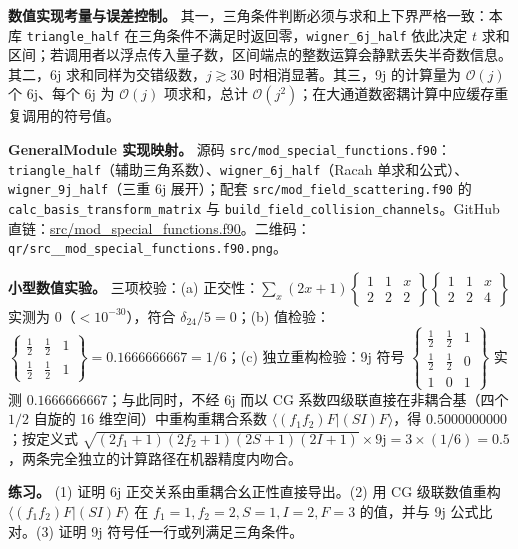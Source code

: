 \documentclass[
]{ctexbook}
\begin{document}
\textbf{数值实现考量与误差控制。}
其一，三角条件判断必须与求和上下界严格一致：本库 \texttt{triangle\_half}
在三角条件不满足时返回零，\texttt{wigner\_6j\_half} 依此决定 \(t\)
求和区间；若调用者以浮点传入量子数，区间端点的整数运算会静默丢失半奇数信息。其二，6j
求和同样为交错级数，\(j\gtrsim 30\) 时相消显著。其三，9j 的计算量为
\(\mathcal{O}(j)\) 个 6j、每个 6j 为 \(\mathcal{O}(j)\) 项求和，总计
\(\mathcal{O}(j^{2})\)；在大通道数密耦计算中应缓存重复调用的符号值。

\textbf{GeneralModule 实现映射。} 源码
\texttt{src/mod\_special\_functions.f90}：\texttt{triangle\_half}（辅助三角系数）、\texttt{wigner\_6j\_half}（Racah
单求和公式）、\texttt{wigner\_9j\_half}（三重 6j 展开）；配套
\texttt{src/mod\_field\_scattering.f90} 的
\texttt{calc\_basis\_transform\_matrix} 与
\texttt{build\_field\_collision\_channels}。GitHub
直链：\href{https://github.com/l1Ha/QuantumGeneralModule/blob/main/src/mod_special_functions.f90}{src/mod\_special\_functions.f90}。二维码：\texttt{qr/src\_\_mod\_special\_functions.f90.png}。

\textbf{小型数值实验。} 三项校验：(a)
正交性：\(\sum_x(2x+1)\begin{Bmatrix}1&1&x\\2&2&2\end{Bmatrix}\begin{Bmatrix}1&1&x\\2&2&4\end{Bmatrix}\)
实测为 \(0\)（\(<10^{-30}\)），符合 \(\delta_{24}/5=0\)；(b)
值检验：\(\begin{Bmatrix}\tfrac12&\tfrac12&1\\ \tfrac12&\tfrac12&1\end{Bmatrix}=0.1666666667=1/6\)；(c)
独立重构检验：9j 符号
\(\begin{Bmatrix}\tfrac12&\tfrac12&1\\ \tfrac12&\tfrac12&0\\ 1&0&1\end{Bmatrix}\)
实测 \(0.1666666667\)；与此同时，不经 6j 而以 CG
系数四级联直接在非耦合基（四个 \(1/2\) 自旋的 16
维空间）中重构重耦合系数 \(\langle(f_1f_2)F|(SI)F\rangle\)，得
\(0.5000000000\)；按定义式
\(\sqrt{(2f_1+1)(2f_2+1)(2S+1)(2I+1)}\times\text{9j}=3\times(1/6)=0.5\)，两条完全独立的计算路径在机器精度内吻合。

\textbf{练习。} (1) 证明 6j 正交关系由重耦合幺正性直接导出。(2) 用 CG
级联数值重构 \(\langle(f_1f_2)F|(SI)F\rangle\) 在
\(f_1=1,f_2=2,S=1,I=2,F=3\) 的值，并与 9j 公式比对。(3) 证明 9j
符号任一行或列满足三角条件。
\end{document}
